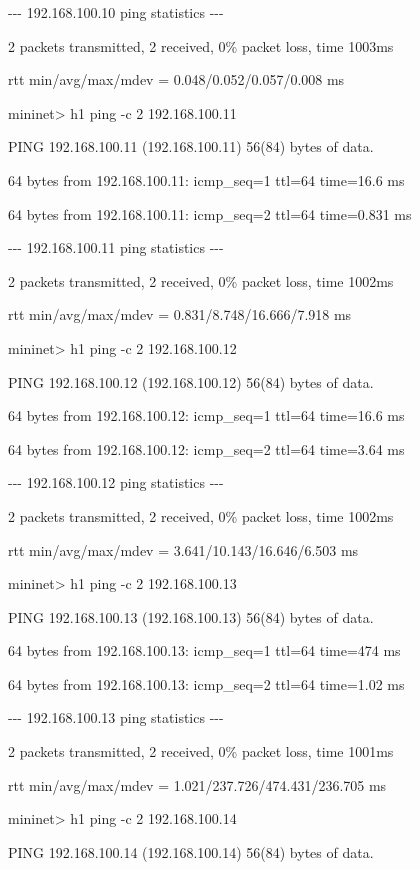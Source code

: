 {}-{}-{}- 192.168.100.10 ping statistics -{}-{}-

2 packets transmitted, 2 received, 0\% packet loss, time 1003ms

rtt min/avg/max/mdev = 0.048/0.052/0.057/0.008 ms

mininet{\textgreater} h1 ping -c 2 192.168.100.11

PING 192.168.100.11 (192.168.100.11) 56(84) bytes of data.

64 bytes from 192.168.100.11: icmp\_seq=1 ttl=64 time=16.6 ms

64 bytes from 192.168.100.11: icmp\_seq=2 ttl=64 time=0.831 ms


\bigskip

{}-{}-{}- 192.168.100.11 ping statistics -{}-{}-

2 packets transmitted, 2 received, 0\% packet loss, time 1002ms

rtt min/avg/max/mdev = 0.831/8.748/16.666/7.918 ms

mininet{\textgreater} h1 ping -c 2 192.168.100.12

PING 192.168.100.12 (192.168.100.12) 56(84) bytes of data.

64 bytes from 192.168.100.12: icmp\_seq=1 ttl=64 time=16.6 ms

64 bytes from 192.168.100.12: icmp\_seq=2 ttl=64 time=3.64 ms


\bigskip

{}-{}-{}- 192.168.100.12 ping statistics -{}-{}-

2 packets transmitted, 2 received, 0\% packet loss, time 1002ms

rtt min/avg/max/mdev = 3.641/10.143/16.646/6.503 ms

mininet{\textgreater} h1 ping -c 2 192.168.100.13

PING 192.168.100.13 (192.168.100.13) 56(84) bytes of data.

64 bytes from 192.168.100.13: icmp\_seq=1 ttl=64 time=474 ms

64 bytes from 192.168.100.13: icmp\_seq=2 ttl=64 time=1.02 ms


\bigskip

{}-{}-{}- 192.168.100.13 ping statistics -{}-{}-

2 packets transmitted, 2 received, 0\% packet loss, time 1001ms

rtt min/avg/max/mdev = 1.021/237.726/474.431/236.705 ms

mininet{\textgreater} h1 ping -c 2 192.168.100.14

PING 192.168.100.14 (192.168.100.14) 56(84) bytes of data.

